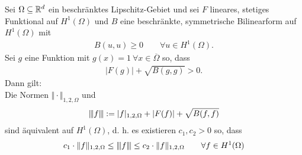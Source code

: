 \newpage
\begin{proposition}\label{prop1.11}
Sei $\Omega\subseteq\mathbb{R}^d$ ein beschränktes Lipschitz-Gebiet und sei $F$ lineares, stetiges Funktional auf $H^1(\Omega)$ und $B$ eine beschränkte, symmetrische Bilinearform auf $H^1(\Omega)$ mit
\begin{align*}
B(u,u)\geq0\qquad\forall u\in H^1(\Omega).
\end{align*}
Sei $g$ eine Funktion mit $g(x)=1~\forall x\in\overline{\Omega}$ so, dass
\begin{align*}
|F(g)|+\sqrt{B(g,g)}>0.
\end{align*}
Dann gilt:\\
Die Normen $\Vert\cdot\Vert_{1,2,\Omega}$ und
\begin{align*}
{\left\vert\kern-0.25ex\left\vert\kern-0.25ex\left\vert f \right\vert\kern-0.25ex\right\vert\kern-0.25ex\right\vert}:=|f|_{1,2,\Omega}+|F(f)|+\sqrt{B(f,f)}
\end{align*}
sind äquivalent auf $H^1(\Omega)$, d. h. es existieren $c_1,c_2>0$ so, dass
\begin{align*}
c_1\cdot\Vert f\Vert_{1,2,\Omega}\leq{\left\vert\kern-0.25ex\left\vert\kern-0.25ex\left\vert f \right\vert\kern-0.25ex\right\vert\kern-0.25ex\right\vert}
\leq
c_2\cdot\Vert f\Vert_{1,2,\Omega}
\qquad\forall f\in H^1(\Omega)
\end{align*}
\end{proposition}
